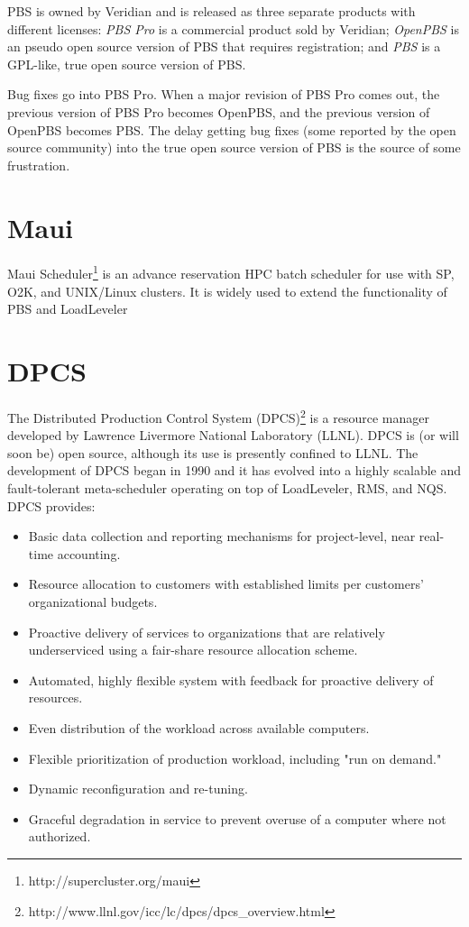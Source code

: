 \documentclass{article}
\begin{document}
PBS is owned by Veridian and is released as three separate products with
different licenses: {\em PBS Pro} is a commercial product sold by Veridian;
{\em OpenPBS} is an pseudo open source version of PBS that requires 
registration; and
{\em PBS} is a GPL-like, true open source version of PBS.

Bug fixes go into PBS Pro.  When a major revision of PBS Pro comes out,
the previous version of PBS Pro becomes OpenPBS, and the previous version
of OpenPBS becomes PBS.  The delay getting bug fixes (some reported by the
open source community) into the true open source version of PBS is the source
of some frustration.

\section{Maui}

Maui Scheduler\footnote{http://supercluster.org/maui}
is an advance reservation HPC batch scheduler for use with SP, 
O2K, and UNIX/Linux clusters. It is widely used to extend the 
functionality of PBS and LoadLeveler

\section{DPCS}

The Distributed Production Control System (DPCS)\footnote{
http://www.llnl.gov/icc/lc/dpcs/dpcs\_overview.html}
is a resource manager developed by Lawrence Livermore National Laboratory (LLNL). 
DPCS is (or will soon be) open source, although its use is presently 
confined to LLNL. The development of DPCS began in 1990 and it has 
evolved into a highly scalable and fault-tolerant meta-scheduler 
operating on top of LoadLeveler, RMS, and NQS. DPCS provides: 
\begin{itemize}
\item Basic data collection and reporting mechanisms for project-level, 
      near real-time accounting.
\item Resource allocation to customers with established limits per 
      customers' organizational budgets. 
\item Proactive delivery of services to organizations that are relatively 
      underserviced using a fair-share resource allocation scheme.
\item Automated, highly flexible system with feedback for proactive delivery 
      of resources.
\item Even distribution of the workload across available computers.
\item Flexible prioritization of production workload, including "run on demand."
\item Dynamic reconfiguration and re-tuning.
\item Graceful degradation in service to prevent overuse of a computer where 
      not authorized.
\end{itemize}
\end{document}
